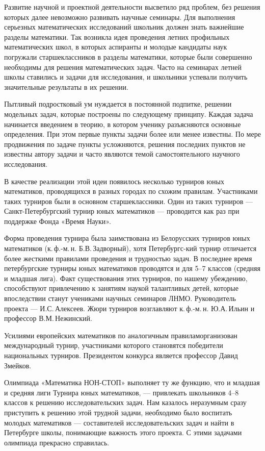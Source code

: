 \ms\abz Развитие научной и проектной деятельности высветило ряд проблем, без решения которых далее невозможно развивать научные семинары. Для выполнения серьезных математических исследований школьник должен знать важнейшие разделы математики. Так возникла идея проведения летних профильных математических школ, в которых аспиранты и молодые кандидаты наук погружали старшеклассников в разделы математики, которые были совершенно необходимы для решения математических задач. Часто на семинарах летней школы ставились и задачи для исследования, и школьники успевали получить значительные результаты в их решении. 

\ms\abz Пытливый подростковый ум нуждается в постоянной подпитке, решении модельных задач, которые построены по следующему принципу. Каждая задача начинается введением в теорию, в котором ученику разъясняются основные определения. При этом первые пункты задачи более или менее известны. По мере продвижения по задаче пункты усложняются, решения последних пунктов не известны автору задачи и часто являются темой самостоятельного научного исследования.

\ms\abz В качестве реализации этой идеи появилось несколько турниров юных математиков, проводящихся в разных городах по схожим правилам. Участниками таких турниров были в основном старшеклассники. Один из таких турниров — Санкт-Петербургский турнир юных математиков — проводится как раз при поддержке Фонда «Время Науки».

\ms\abz Форма проведения турнира была заимствована из Белорусских турниров юных математиков (к.\,ф.-м.\,н. Б.В.\,Задворный), хотя Петербургс-\linebreak кий турнир отличается более жесткими правилами проведения и трудностью задач. В последнее время петербургские турниры юных математиков проводятся и для 5–7 классов (средняя и младшая лига). Факт существования этих турниров, по нашему убеждению, способствуют привлечению к занятиям наукой талантливых детей, которые впоследствии станут учениками научных семинаров ЛНМО. Руководитель проекта — И.С.\,Алексеев. Жюри турниров возглавляют к.\,ф.-м.\,н. Ю.А.\,Ильин и профессор В.М.\,Нежинский.

\ms\abz Усилиями европейских математиков по аналогичным правилам\linebreak организован международный турнир, участниками которого становятся победители национальных турниров. Президентом конкурса является профессор Давид Змейков.  

\ms\abz Олимпиада «Математика НОН-СТОП» выполняет ту же функцию, что и младшая и средняя лиги Турнира юных математиков, — привлекать школьников 4–8 классов к решению исследовательских задач. Нам казалось неразумным сразу приступить к решению этой трудной задачи, необходимо было воспитать молодых математиков — составителей  исследовательских задач и найти в Петербурге школы, понимающие важность этого проекта. С этими задачами олимпиада прекрасно справилась.

